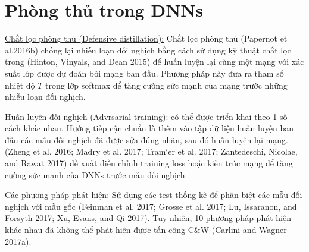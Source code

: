 \section{Phòng thủ trong DNNs}
\underline{Chắt lọc phòng thủ (Defensive distillation):} Chắt lọc phòng thủ (Papernot et al.2016b) 
chống lại nhiễu loạn đối nghịch bằng cách sử dụng kỹ thuật chắt lọc trong (Hinton, 
Vinyals, and Dean 2015) để huấn luyện lại cùng một mạng với xác suất lớp được dự đoán bởi 
mạng ban đầu. Phương pháp này đưa ra tham số nhiệt độ $T$ trong lớp softmax để tăng cường 
sức mạnh của mạng trước những nhiễu loạn đối nghịch.

\underline{Huấn luyện đối nghịch (Advrsarial training):} có thể được triển khai theo 1 số cách khác nhau. 
Hướng tiếp cận chuẩn là thêm vào tập dữ liệu huấn luyện ban đầu các mẫu đối nghịch đã được 
sửa đúng nhãn, sau đó huấn luyện lại mạng. (Zheng et al. 2016; Madry et al. 2017; 
Tram`er et al. 2017; Zantedeschi, Nicolae, and Rawat 2017) đề xuất điều chỉnh training 
loss hoặc kiến trúc mạng để tăng cường sức mạnh của DNNs trước mẫu đối nghịch.

\underline{Các phương pháp phát hiện:} Sử dụng các test thống kê để phân biệt các mẫu đối nghịch 
với mẫu gốc (Feinman et al. 2017; Grosse et al. 2017; Lu, Issaranon, and Forsyth 2017; 
Xu, Evans, and Qi 2017). Tuy nhiên, 10 phương pháp phát hiện khác nhau đã không thể phát 
hiện được tấn công C\&W (Carlini and Wagner 2017a).